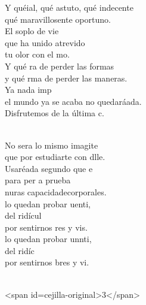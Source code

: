 \begin{cancion}
	Y quéial, qué astuto, qué indecente\\
	qué maravillosente oportuno.\\
	El soplo de vie\\
que ha unido atrevido\\
	tu olor con el mo.\\
	Y qué ra de perder las formas\\
	y qué rma de perder las maneras.\\
	Ya nada imp \\
	el mundo ya se acaba no quedaráada.\\
	Disfrutemos de la última c.  \\\jump\\
	\begin{chorus}%
	No sera lo mismo imagite\\
	que por estudiarte con dlle.\\
	Usaréada segundo que e\\
	para per a prueba \\
	nuras capacidadecorporales.\\
\jump
	lo quedan probar uenti,\\
	del ridícul\\
	por sentirnos res y vis.\\
	lo quedan probar unnti,\\
	del ridíc\\
	por sentirnos bres y vi.\\
	\end{chorus}%
	\jump\\
<span id=cejilla-original>3</span>\\
\end{cancion}%
